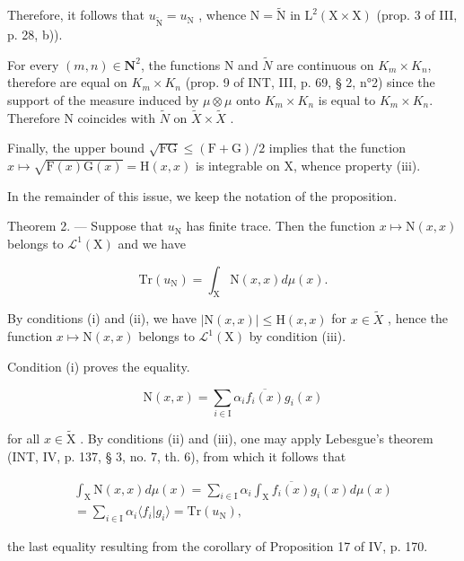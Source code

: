 Therefore, it follows that \(u_{\widetilde{\mathrm{N}}} = u_{\mathrm{N}}\) , whence \(\mathrm{N} = \widetilde{\mathrm{N}}\) in \(\mathrm{L}^2(\mathrm{X} \times \mathrm{X})\) (prop. 3 of III, p. 28, b)).

For every \((m,n)\in\mathbf{N}^{2}\), the functions N and \(\widetilde{N}\) are continuous on \(K_{m}\times K_{n}\), therefore are equal on \(K_{m}\times K_{n}\) (prop. 9 of INT, III, p. 69, § 2, n°2) since the support of the measure induced by \(\mu\otimes\mu\) onto \(K_{m}\times K_{n}\) is equal to \(K_{m}\times K_{n}\). Therefore N coincides with \(\widetilde{N}\) on \(\widetilde{X}\times\widetilde{X}\) .

Finally, the upper bound \(\sqrt{\mathrm{FG}} \leqslant (\mathrm{F} + \mathrm{G}) / 2\) implies that the function \(x \mapsto \sqrt{\mathrm{F}(x)\mathrm{G}(x)} = \mathrm{H}(x,x)\) is integrable on X, whence property (iii).

In the remainder of this issue, we keep the notation of the proposition.

Theorem 2. --- Suppose that \(u_{\mathrm{N}}\) has finite trace. Then the function \(x \mapsto \mathrm{N}(x, x)\) belongs to \(\mathcal{L}^1(\mathrm{X})\) and we have

\[
\mathrm{Tr} (u _ {\mathrm{N}}) = \int_ {\mathrm{X}} \mathrm{N} (x, x) d \mu (x).
\]

By conditions (i) and (ii), we have \(|\mathrm{N}(x,x)| \leqslant \mathrm{H}(x,x)\) for \(x \in \widetilde{X}\) , hence the function \(x \mapsto \mathrm{N}(x,x)\) belongs to \(\mathcal{L}^{1}(\mathrm{X})\) by condition (iii).

Condition (i) proves the equality.

\[
\mathrm{N} (x, x) = \sum_ {i \in \mathrm{I}} \alpha_ {i} \overline {{f _ {i} (x)}} g _ {i} (x)
\]

for all \(x \in \widetilde{\mathrm{X}}\) . By conditions (ii) and (iii), one may apply Lebesgue's theorem (INT, IV, p. 137, § 3, no. 7, th. 6), from which it follows that

\[
\begin{array}{r} \int_ {\mathrm{X}} \mathrm{N} (x, x) d \mu (x) = \sum_ {i \in \mathrm{I}} \alpha_ {i} \int_ {\mathrm{X}} \overline {{f _ {i} (x)}} g _ {i} (x) d \mu (x) \\ = \sum_ {i \in \mathrm{I}} \alpha_ {i} \langle f _ {i} | g _ {i} \rangle = \mathrm{Tr} (u _ {\mathrm{N}}), \end{array}
\]

the last equality resulting from the corollary of Proposition 17 of IV, p. 170.

